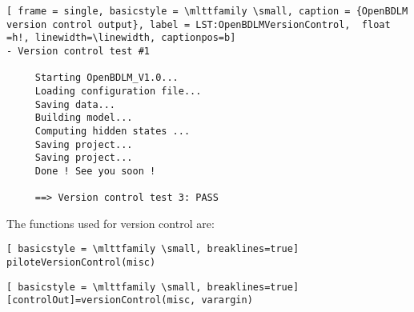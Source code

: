  \begin{lstlisting}[ frame = single, basicstyle = \mlttfamily \small, caption = {OpenBDLM version control output}, label = LST:OpenBDLMVersionControl,  float =h!, linewidth=\linewidth, captionpos=b]
- Version control test #1
 
     Starting OpenBDLM_V1.0...
     Loading configuration file...
     Saving data...
     Building model...
     Computing hidden states ...
     Saving project...
     Saving project...
     Done ! See you soon !
 
     ==> Version control test 3: PASS
\end{lstlisting}

The functions used for version control are:
\begin{description}[style=unboxed]

\item[Pilote function for version control] \leavevmode
  \begin{lstlisting}[ basicstyle = \mlttfamily \small, breaklines=true]
piloteVersionControl(misc)
  \end{lstlisting}

\item[Version control for OpenBDLM] \leavevmode
  \begin{lstlisting}[ basicstyle = \mlttfamily \small, breaklines=true]
[controlOut]=versionControl(misc, varargin)
  \end{lstlisting}

\end{description}